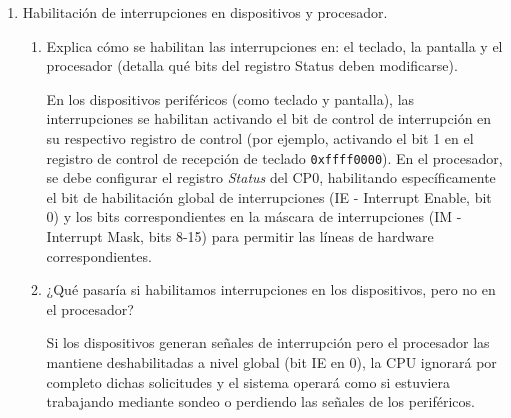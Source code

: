 \documentclass[12pt,a4paper]{article}
\begin{document}
\begin{enumerate}[label=\arabic*.]
\begin{enumerate}[label=\alph*)]
        \vspace{0.3cm}
        \noindent
        Dos estrategias comunes son el manejo centralizado (vectores fijos donde todas las excepciones apuntan a una única dirección de atención que evalúa la causa) y el manejo vectoreado (donde cada excepción posee su propia dirección de salto específica). La ejecución se redirige modificando el flujo del programa hacia una dirección de memoria predeterminada (por ejemplo, en MIPS suele ser \texttt{0x80000180}). La función del registro \textbf{EPC} es almacenar la dirección de la instrucción interrumpida o afectada para permitir que, una vez solucionada la excepción, el procesador pueda retornar exactamente al punto donde se encontraba.
    \end{enumerate}

    \item Habilitación de interrupciones en dispositivos y procesador.
    
    \begin{enumerate}[label=\alph*)]
        \item Explica cómo se habilitan las interrupciones en: el teclado, la pantalla y el procesador (detalla qué bits del registro Status deben modificarse).
        
        \vspace{0.3cm}
        \noindent
        En los dispositivos periféricos (como teclado y pantalla), las interrupciones se habilitan activando el bit de control de interrupción en su respectivo registro de control (por ejemplo, activando el bit 1 en el registro de control de recepción de teclado \texttt{0xffff0000}). En el procesador, se debe configurar el registro \textit{Status} del CP0, habilitando específicamente el bit de habilitación global de interrupciones (IE - Interrupt Enable, bit 0) y los bits correspondientes en la máscara de interrupciones (IM - Interrupt Mask, bits 8-15) para permitir las líneas de hardware correspondientes.

        \item ¿Qué pasaría si habilitamos interrupciones en los dispositivos, pero no en el procesador?
        
        \vspace{0.3cm}
        \noindent
        Si los dispositivos generan señales de interrupción pero el procesador las mantiene deshabilitadas a nivel global (bit IE en 0), la CPU ignorará por completo dichas solicitudes y el sistema operará como si estuviera trabajando mediante sondeo o perdiendo las señales de los periféricos.
    \end{enumerate}


\end{enumerate}
\end{document}
